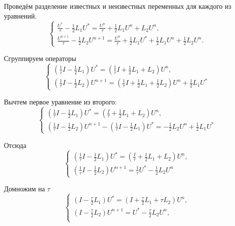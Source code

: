 \documentclass[a4paper,12pt]{article}
\begin{document}
Проведём разделение известных и неизвестных переменных для каждого из уравнений.
\begin{equation*}
  \begin{cases}
    \frac{U^*}{\tau} - \frac{1}{2} L_1 U^* = \frac{U^n}{\tau} + \frac{1}{2} L_1 U^n + L_2 U^n, \\
    \frac{U^{n+1}}{\tau} - \frac{1}{2} L_2 U^{n+1} = \frac{U^n}{\tau} + \frac{1}{2} L_1 U^* + \frac{1}{2} L_1 U^n + \frac{1}{2} L_2 U^n.
  \end{cases}
\end{equation*}

Сгруппируем операторы
\begin{equation*}
  \begin{cases}
    \left( \frac{1}{\tau} I - \frac{1}{2} L_1 \right) U^* = \left( \frac{1}{\tau} I + \frac{1}{2} L_1 + L_2 \right) U^n, \\
    \left( \frac{1}{\tau} I - \frac{1}{2} L_2 \right) U^{n+1} = \left( \frac{1}{\tau} I  + \frac{1}{2} L_1 + \frac{1}{2} L_2 \right) U^n + \frac{1}{2} L_1 U^*
  \end{cases}
\end{equation*}

Вычтем первое уравнение из второго:
\begin{equation*}
  \begin{cases}
    \left( \frac{1}{\tau} I - \frac{1}{2} L_1 \right) U^* = \left( \frac{I}{\tau} + \frac{1}{2} L_1 + L_2 \right) U^n, \\
    \left( \frac{1}{\tau} I - \frac{1}{2} L_2 \right) U^{n+1} - \left( \frac{1}{\tau} I - \frac{1}{2} L_1 \right) U^* = - \frac{1}{2} L_2 U^n + \frac{1}{2} L_1 U^*
  \end{cases}
\end{equation*}

Отсюда
\begin{equation*}
  \begin{cases}
    \left( \frac{1}{\tau} I - \frac{1}{2} L_1 \right) U^* = \left( \frac{I}{\tau} + \frac{1}{2} L_1 + L_2 \right) U^n, \\
    \left( \frac{1}{\tau} I - \frac{1}{2} L_2 \right) U^{n+1} = \frac{1}{\tau} U^* - \frac{1}{2} L_2 U^n
  \end{cases}
\end{equation*}

Домножим на $\tau$
\begin{equation*}
  \begin{cases}
    \left( I - \frac{\tau}{2} L_1 \right) U^* = \left( I + \frac{\tau}{2} L_1 + \tau L_2 \right) U^n, \\
    \left( I - \frac{\tau}{2} L_2 \right) U^{n+1} = U^* - \frac{\tau}{2} L_2 U^n, \\
  \end{cases}
\end{equation*}
\end{document}
